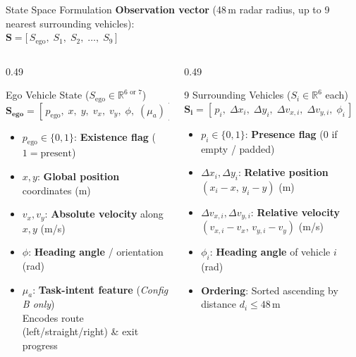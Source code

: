 \documentclass[aspectratio=169,10pt]{beamer}
\begin{document}
\begin{frame}{State Space Formulation}
	\small
	\vspace{-6pt}
	\centering
	\textbf{Observation vector} (48\,m radar radius, up to 9 nearest surrounding vehicles):\\
	\vspace{1pt}
	$\mathbf{S} = \big[\, S_{\text{ego}}, \; S_1, \; S_2, \; \dots, \; S_9 \,\big]$
	\vspace{2pt}

	\begin{columns}[T]
		\begin{column}{0.49\textwidth}
			\begin{block}{Ego Vehicle State ($S_{\text{ego}} \in \mathbb{R}^{6\text{ or }7}$)}
				\scriptsize
				$\mathbf{S_{\text{ego}}} = [\, p_{\text{ego}}, \; x, \; y, \; v_x, \; v_y, \; \phi, \; (\mu_a) \,]$
				\vspace{2pt}
				\begin{itemize}\setlength{\itemsep}{1.5pt}
					\item $p_{\text{ego}} \in \{0, 1\}$: \textbf{Existence flag} ($1 = \text{present}$)
					\item $x, y$: \textbf{Global position} coordinates (m)
					\item $v_x, v_y$: \textbf{Absolute velocity} along $x, y$ (m/s)
					\item $\phi$: \textbf{Heading angle} / orientation (rad)
					\item $\mu_a$: \textbf{Task-intent feature} (\textit{Config B only})\\
					      Encodes route (left/straight/right) \& exit progress
				\end{itemize}
			\end{block}
		\end{column}
		\begin{column}{0.49\textwidth}
			\begin{block}{9 Surrounding Vehicles ($S_i \in \mathbb{R}^{6}$ each)}
				\scriptsize
				$\mathbf{S_i} = [\, p_i, \; \Delta x_i, \; \Delta y_i, \; \Delta v_{x,i}, \; \Delta v_{y,i}, \; \phi_i \,]$
				\vspace{2pt}
				\begin{itemize}\setlength{\itemsep}{1.5pt}
					\item $p_i \in \{0, 1\}$: \textbf{Presence flag} ($0$ if empty / padded)
					\item $\Delta x_i, \Delta y_i$: \textbf{Relative position} $(x_i - x,\, y_i - y)$ (m)
					\item $\Delta v_{x,i}, \Delta v_{y,i}$: \textbf{Relative velocity} $(v_{x,i} - v_x,\, v_{y,i} - v_y)$ (m/s)
					\item $\phi_i$: \textbf{Heading angle} of vehicle $i$ (rad)
					\item \textbf{Ordering}: Sorted ascending by distance $d_i \le 48$\,m
				\end{itemize}
			\end{block}
		\end{column}
	\end{columns}
\end{frame}
\end{document}

